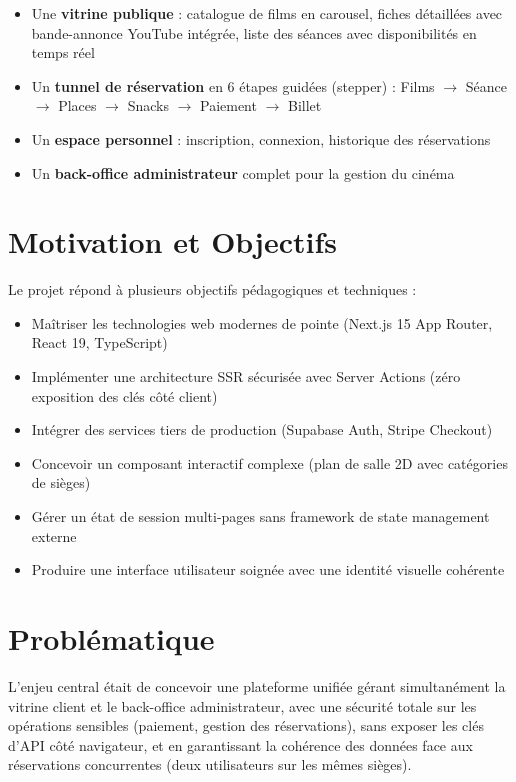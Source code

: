 \documentclass[12pt,a4paper,openany]{report}
\begin{document}
\begin{itemize}
  \item Une \textbf{vitrine publique} : catalogue de films en carousel, fiches détaillées avec bande-annonce YouTube intégrée, liste des séances avec disponibilités en temps réel
  \item Un \textbf{tunnel de réservation} en 6 étapes guidées (stepper) : Films $\rightarrow$ Séance $\rightarrow$ Places $\rightarrow$ Snacks $\rightarrow$ Paiement $\rightarrow$ Billet
  \item Un \textbf{espace personnel} : inscription, connexion, historique des réservations
  \item Un \textbf{back-office administrateur} complet pour la gestion du cinéma
\end{itemize}

\section{Motivation et Objectifs}

Le projet répond à plusieurs objectifs pédagogiques et techniques :

\begin{itemize}
  \item Maîtriser les technologies web modernes de pointe (Next.js 15 App Router, React 19, TypeScript)
  \item Implémenter une architecture SSR sécurisée avec Server Actions (zéro exposition des clés côté client)
  \item Intégrer des services tiers de production (Supabase Auth, Stripe Checkout)
  \item Concevoir un composant interactif complexe (plan de salle 2D avec catégories de sièges)
  \item Gérer un état de session multi-pages sans framework de state management externe
  \item Produire une interface utilisateur soignée avec une identité visuelle cohérente
\end{itemize}

\section{Problématique}

L'enjeu central était de concevoir une plateforme unifiée gérant simultanément la vitrine client et le back-office administrateur, avec une sécurité totale sur les opérations sensibles (paiement, gestion des réservations), sans exposer les clés d'API côté navigateur, et en garantissant la cohérence des données face aux réservations concurrentes (deux utilisateurs sur les mêmes sièges).
\end{document}
